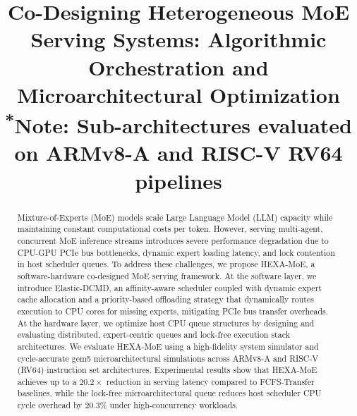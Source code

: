 \documentclass[conference]{IEEEtran}
\begin{document}
\title{Co-Designing Heterogeneous MoE Serving Systems: Algorithmic Orchestration and Microarchitectural Optimization\\
{\footnotesize \textsuperscript{*}Note: Sub-architectures evaluated on ARMv8-A and RISC-V RV64 pipelines}
}

\author{
\and
{}
}

\maketitle

\begin{abstract}
Mixture-of-Experts (MoE) models scale Large Language Model (LLM) capacity while maintaining constant computational costs per token. However, serving multi-agent, concurrent MoE inference streams introduces severe performance degradation due to CPU-GPU PCIe bus bottlenecks, dynamic expert loading latency, and lock contention in host scheduler queues. To address these challenges, we propose HEXA-MoE, a software-hardware co-designed MoE serving framework. At the software layer, we introduce Elastic-DCMD, an affinity-aware scheduler coupled with dynamic expert cache allocation and a priority-based offloading strategy that dynamically routes execution to CPU cores for missing experts, mitigating PCIe bus transfer overheads. At the hardware layer, we optimize host CPU queue structures by designing and evaluating distributed, expert-centric queues and lock-free execution stack architectures. We evaluate HEXA-MoE using a high-fidelity system simulator and cycle-accurate gem5 microarchitectural simulations across ARMv8-A and RISC-V (RV64) instruction set architectures. Experimental results show that HEXA-MoE achieves up to a $20.2\times$ reduction in serving latency compared to FCFS-Transfer baselines, while the lock-free microarchitectural queue reduces host scheduler CPU cycle overhead by 20.3\% under high-concurrency workloads.
\end{abstract}
\end{document}
